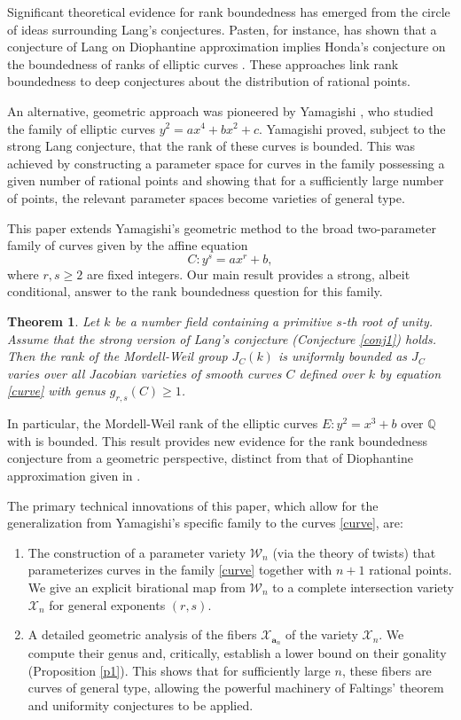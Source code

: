\documentclass[11pt, a4paper]{amsart}
\newtheorem{thm}{Theorem}[section]
\theoremstyle{definition}
\newcommand{\Q}{\mathbb{Q}}
\newcommand{\Wc}{\mathcal{W}}
\newcommand{\Xc}{\mathcal{X}}
\newcommand{\ba}{\mathbf{a}}
\begin{document}
Significant theoretical evidence for rank boundedness has emerged from the circle of ideas surrounding Lang's conjectures. Pasten, for instance, has shown that a conjecture of Lang on Diophantine approximation implies Honda's conjecture on the boundedness of ranks of elliptic curves \cite{Pasten2019}. These approaches link rank boundedness to deep conjectures about the distribution of rational points.

An alternative, geometric approach was pioneered by Yamagishi \cite{Yamagishi2003}, who studied the family of elliptic curves $y^2=ax^4+bx^2+c$. Yamagishi proved, subject to the strong Lang conjecture, that the rank of these curves is bounded. This was achieved by constructing a parameter space for curves in the family possessing a given number of rational points and showing that for a sufficiently large number of points, the relevant parameter spaces become varieties of general type.

This paper extends Yamagishi's geometric method to the broad two-parameter family of curves given by the affine equation
\begin{equation} \label{curve}
	C: y^s=ax^r+b,
\end{equation}
where $r, s \geq 2$ are fixed integers. Our main result provides a strong, albeit conditional, answer to the rank boundedness question for this family.

\begin{thm} \label{main}
	Let $k$ be a number field containing a primitive $s$-th root of unity. Assume that the strong version of Lang's conjecture (Conjecture \ref{conj1}) holds. Then the rank of the Mordell-Weil group $J_C(k)$ is uniformly bounded as $J_C$ varies over all Jacobian varieties of smooth curves $C$ defined over $k$ by equation \eqref{curve} with genus $g_{r,s}(C) \geq 1$.
\end{thm}

In particular, the Mordell-Weil rank of the elliptic curves   $E: y^2= x^3+b$ over $\Q$ with   is bounded.
This result provides new evidence for the rank boundedness conjecture from a geometric perspective, distinct from that of Diophantine approximation given in \cite{Pasten2019}. 


The primary technical innovations of this paper, which allow for the generalization from Yamagishi's specific family to the curves \eqref{curve}, are:
\begin{enumerate}
	\item The construction of a parameter variety $\Wc_n$ (via the theory of twists) that parameterizes curves in the family \eqref{curve} together with $n+1$ rational points. We give an explicit birational map from $\Wc_n$ to a complete intersection variety $\Xc_n$ for general exponents $(r,s)$.
	\item A detailed geometric analysis of the fibers $\Xc_{\ba_n}$ of the variety $\Xc_n$. We compute their genus and, critically, establish a lower bound on their gonality (Proposition \ref{p1}). This shows that for sufficiently large $n$, these fibers are curves of general type, allowing the powerful machinery of Faltings' theorem and uniformity conjectures to be applied.
\end{enumerate}
\end{document}

